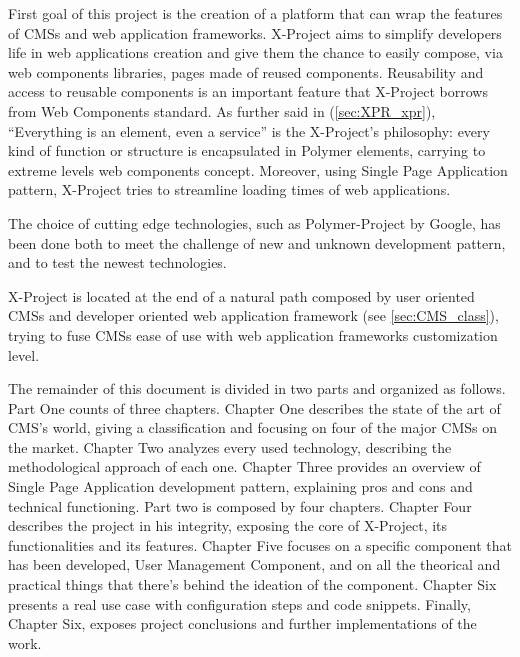First goal of this project is the creation of a platform that can wrap the features of CMSs and web application frameworks. 
X-Project aims to simplify developers life in web applications creation and give them the chance to easily compose, via web components libraries, pages made of reused components.
Reusability and access to reusable components is an important feature that X-Project borrows from Web Components standard.
As further said in (\ref{sec:XPR_xpr}), ``Everything is an element, even a service'' is the X-Project's philosophy: every kind of function or structure is encapsulated in Polymer elements, carrying to extreme levels web components concept. 
Moreover, using Single Page Application pattern, X-Project tries to streamline loading times of web applications.

The choice of cutting edge technologies, such as Polymer-Project by Google, has been done both to meet the challenge of new and unknown development pattern, and to test the newest technologies.

X-Project is located at the end of a natural path composed by user oriented CMSs and developer oriented web application framework (see \ref{sec:CMS_class}), trying to fuse CMSs ease of use with web application frameworks customization level.

The remainder of this document is divided in two parts and organized as follows. Part One counts of three chapters. Chapter One describes the state of the art of CMS's world, giving a classification and focusing on four of the major CMSs on the market. Chapter Two analyzes every used technology, describing the methodological approach of each one. Chapter Three provides an overview of Single Page Application development pattern, explaining pros and cons and technical functioning.
Part two is composed by four chapters. Chapter Four describes the project in his integrity, exposing the core of X-Project, its functionalities and its features.
Chapter Five focuses on a specific component that has been developed, User Management Component, and on all the theorical and practical things that there's behind the ideation of the component. Chapter Six presents a real use case with configuration steps and code snippets.
Finally, Chapter Six, exposes project conclusions and further implementations of the work.



